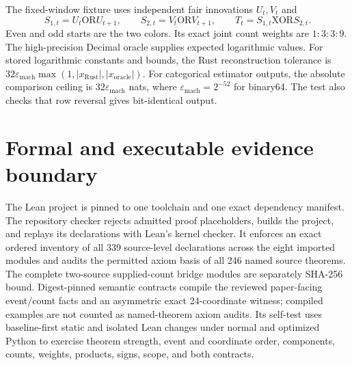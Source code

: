 \documentclass[11pt]{article}
\theoremstyle{definition}
\begin{document}
The fixed-window fixture uses independent fair innovations $U_t,V_t$ and
\begin{equation}
  S_{1,t}=U_t\mathbin{\mathrm{OR}}U_{t+1},
  \qquad
  S_{2,t}=V_t\mathbin{\mathrm{OR}}V_{t+1},
  \qquad
  T_t=S_{1,t}\mathbin{\mathrm{XOR}}S_{2,t}.
\end{equation}
Even and odd starts are the two colors.  Its exact joint count weights are $1:3:3:9$.  The
high-precision Decimal oracle supplies expected logarithmic values.  For stored logarithmic
constants and bounds, the Rust reconstruction tolerance is
$32\varepsilon_{\mathrm{mach}}\max(1,\lvert x_{\mathrm{Rust}}\rvert,
\lvert x_{\mathrm{oracle}}\rvert)$.  For categorical estimator outputs, the absolute comparison
ceiling is $32\varepsilon_{\mathrm{mach}}$ nats, where
$\varepsilon_{\mathrm{mach}}=2^{-52}$ for binary64.  The test also checks that row reversal gives
bit-identical output.

\section{Formal and executable evidence boundary}

The Lean project is pinned to one toolchain and one exact dependency manifest.  The repository
checker rejects admitted proof placeholders, builds the project, and replays its declarations with
Lean's kernel checker.  It enforces an exact ordered inventory of all 339 source-level declarations
across the eight imported modules and audits the permitted axiom basis of all 246 named source
theorems.  The complete two-source supplied-count bridge modules are separately SHA-256 bound.
Digest-pinned semantic contracts compile the reviewed paper-facing event/count facts and an
asymmetric exact 24-coordinate witness; compiled examples are not counted as named-theorem axiom
audits.  Its self-test uses baseline-first static and isolated Lean changes under normal and
optimized Python to exercise theorem strength, event and coordinate order, components, counts,
weights, products, signs, scope, and both contracts.
\end{document}

